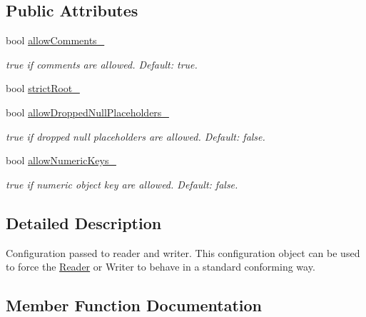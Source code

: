 \subsection*{Public Attributes}
\begin{DoxyCompactItemize}
\item 
\mbox{\label{classJson_1_1Features_a33afd389719624b6bdb23950b3c346c9}} 
bool \hyperlink{classJson_1_1Features_a33afd389719624b6bdb23950b3c346c9}{allow\+Comments\+\_\+}
\begin{DoxyCompactList}\small\item\em {\ttfamily true} if comments are allowed. Default\+: {\ttfamily true}. \end{DoxyCompactList}\item 
bool \hyperlink{classJson_1_1Features_a1162c37a1458adc32582b585b552f9c3}{strict\+Root\+\_\+}
\item 
\mbox{\label{classJson_1_1Features_a5076aa72c05c7596ac339ede36c97a6a}} 
bool \hyperlink{classJson_1_1Features_a5076aa72c05c7596ac339ede36c97a6a}{allow\+Dropped\+Null\+Placeholders\+\_\+}
\begin{DoxyCompactList}\small\item\em {\ttfamily true} if dropped null placeholders are allowed. Default\+: {\ttfamily false}. \end{DoxyCompactList}\item 
\mbox{\label{classJson_1_1Features_aff3cb16b79d15d3d761b11a0dd6d4d6b}} 
bool \hyperlink{classJson_1_1Features_aff3cb16b79d15d3d761b11a0dd6d4d6b}{allow\+Numeric\+Keys\+\_\+}
\begin{DoxyCompactList}\small\item\em {\ttfamily true} if numeric object key are allowed. Default\+: {\ttfamily false}. \end{DoxyCompactList}\end{DoxyCompactItemize}


\subsection{Detailed Description}
Configuration passed to reader and writer. This configuration object can be used to force the \hyperlink{classJson_1_1Reader}{Reader} or Writer to behave in a standard conforming way. 

\subsection{Member Function Documentation}
\mbox{\label{classJson_1_1Features_a63894da6e2c100b38741fa933f3d33ae}} 
